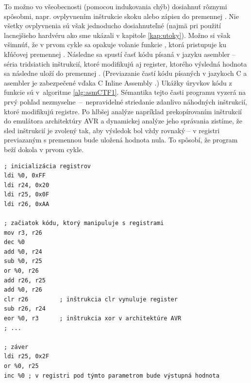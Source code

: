 To možno vo všeobecnosti (pomocou indukovania chýb) dosiahnuť rôznymi spôsobmi, napr. ovplyvnením inštrukcie skoku alebo zápisu do premennej . Nie všetky ovplyvnenia sú však jednoducho dosiahnuteľné (najmä pri použití lacnejšieho hardvéru ako sme ukázali v kapitole \ref{kap:utoky}). Možno si však všimnúť, že v prvom cykle sa opakuje volanie funkcie , ktorá pristupuje ku kľúčovej premennej . Následne sa spustí časť kódu písaná v jazyku asembler -- séria tridsiatich inštrukcií, ktoré modifikujú aj register, ktorého výsledná hodnota sa následne uloží do premennej . (Previazanie častí kódu písaných v jazykoch C a asembler je zabezpečené vďaka C Inline Assembly \cite{inlineAsm}.) Ukážky úryvkov kódu z funkcie  sú v~algoritme \ref{alg:asmCTF1}. Sémantika tejto časti programu vyzerá na prvý pohľad nezmyselne~--~nepravidelné striedanie zdanlivo náhodných inštrukcií, ktoré modifikujú registre. Po hlbšej analýze napríklad prekopírovaním inštrukcií do emulátora architektúry AVR a dynamickej analýze jeho správania zistíme, že sled inštrukcií je zvolený tak, aby výsledok bol vždy rovnaký -- v registri previazaným s premennou  bude uložená hodnota nula. To spôsobí, že program beží dokola v prvom cykle.

\begin{lstlisting}[float,language=AVR,caption={Ukážky kritickej časti kódu funkcie \uv{checkStatus} z príkladu 1. \%0 označuje výstupný parameter -- register s výstupnou hodnotou. Tento parameter je previazaný s globálnou premennou status pomocou C Inline Assembly \cite{inlineAsm}.},label=alg:asmCTF1]
; inicializácia registrov
ldi %0, 0xFF
ldi r24, 0x20
ldi r25, 0x0F
ldi r26, 0xAA

; začiatok kódu, ktorý manipuluje s registrami
mov r3, r26
dec %0
add %0, r24
sub %0, r25
or %0, r26
add r26, r25
add %0, r26
clr r26         ; inštrukcia clr vynuluje register
sub r26, r24
eor %0, r3      ; inštrukcia xor v architektúre AVR
; ...

; záver
ldi r25, 0x2F
or %0, r25
inc %0 ; v registri pod týmto parametrom bude výstupná hodnota
\end{lstlisting}

